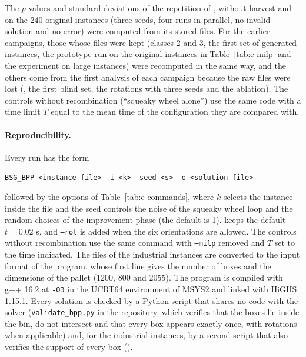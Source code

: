 The $p$-values and standard deviations of the repetition of \cfgfast{}, \cfgfast{} without harvest and \cfgbal{} on the 240 original instances (three seeds, four runs in parallel, no invalid solution and no error) were computed from its stored files.
For the earlier campaigns, those whose files were kept (classes 2 and 3, the first set of generated instances, the prototype run on the original instances in Table~\ref{tab:e-milp} and the experiment on large instances) were recomputed in the same way, and the
others come from the first analysis of each campaign because the raw files were lost (\cfgqual{}, the first blind set, the rotations with three seeds and the ablation). The controls without recombination
(``squeaky wheel alone'') use the same code with a time limit $T$ equal to the mean time of the configuration they are compared with.

\paragraph{Reproducibility.}
Every run has the form
\begin{center}\small\texttt{BSG\_BPP <instance file> -i <k> --seed <s> -o <solution file>}\end{center}
followed by the options of Table~\ref{tab:e-commands}, where $k$ selects the instance inside the file and the seed
controls the noise of the squeaky wheel loop and the random choices of the improvement phase (the default is 1). \cfgqual{} keeps the default $t=0.02$ s, and \texttt{--rot} is added when the six orientations are allowed. The controls without recombination use the same command with \texttt{--milp} removed and $T$ set to the
time indicated. The files of the industrial instances are converted to the input format of the program, whose first line gives the number
of boxes and the dimensions of the pallet (1200, 800 and 2055).
The program is compiled with g++ 16.2 at \texttt{-O3} in the UCRT64 environment of MSYS2 and linked with HiGHS 1.15.1. Every solution is checked by a Python script that shares no code with the solver
(\texttt{validate\_bpp.py} in the repository, which verifies that the boxes lie inside the bin, do not intersect and that every box appears exactly once, with rotations when applicable) and,
for the industrial instances, by a second script that also verifies the support of every box
().

